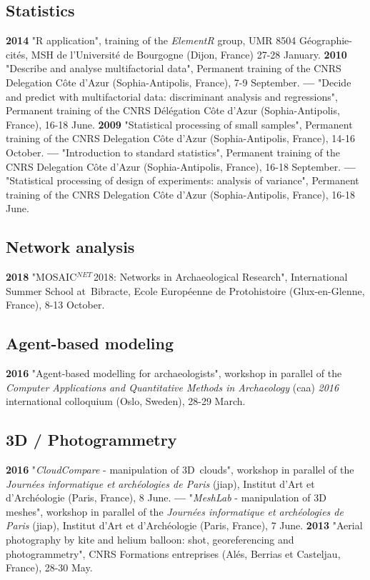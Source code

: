 \documentclass[11pt]{report} %
\begin{document}
\subsection*{Statistics }

\textbf{2014 }"\textsf{R} application", training of the \textit{ElementR} group, UMR 8504 G\'{e}ographie-cit\'{e}s, MSH de l'Universit\'{e} de Bourgogne (Dijon, France) 27-28 January.
\smallbreak
\textbf{2010 }"Describe and analyse multifactorial data", Permanent training of the CNRS Delegation C\^{o}te d'Azur (Sophia-Antipolis, France), 7-9 September.
\smallbreak
\textbf{---  }"Decide and predict with multifactorial data: discriminant analysis and regressions", Permanent training of the CNRS D\'{e}l\'{e}gation C\^{o}te d'Azur (Sophia-Antipolis, France), 16-18 June.
\smallbreak
\textbf{2009 }"Statistical processing of small samples", Permanent training of the CNRS Delegation C\^{o}te d'Azur (Sophia-Antipolis, France), 14-16 October.
\smallbreak
\textbf{---  }"Introduction to standard statistics", Permanent training of the CNRS Delegation C\^{o}te d'Azur (Sophia-Antipolis, France), 16-18 September.
\textbf{---  }"Statistical processing of design of experiments: analysis of variance", Permanent training of the CNRS Delegation C\^{o}te d'Azur (Sophia-Antipolis, France), 16-18 June.
\smallbreak

\subsection*{Network analysis}

\textbf{2018 }"MOSAIC${}^{NET\ }$2018: Networks in Archaeological Research", International Summer School at~Bibracte, Ecole Europ\'{e}enne de Protohistoire (Glux-en-Glenne, France), 8-13 October.

\subsection*{Agent-based modeling}

\textbf{2016 }"Agent-based modelling for archaeologists", workshop in parallel of the \textit{Computer Applications and Quantitative Methods in Archaeology }(caa) \textit{2016 }international colloquium (Oslo, Sweden), 28-29 March.

\subsection*{3D / Photogrammetry}

\textbf{2016 }"\textit{CloudCompare} - manipulation of 3D~clouds", workshop in parallel of the \textit{Journ\'{e}es informatique et arch\'{e}ologies de Paris} (jiap), Institut d'Art et d'Arch\'{e}ologie (Paris, France), 8 June.
\smallbreak
\textbf{---  }"\textit{MeshLab }- manipulation of 3D\textit{ }meshes", workshop in parallel of the \textit{Journ\'{e}es informatique et arch\'{e}ologies de Paris} (jiap), Institut d'Art et d'Arch\'{e}ologie (Paris, France), 7 June.
\smallbreak
\textbf{2013 }"Aerial photography by kite and helium balloon: shot, georeferencing and photogrammetry", CNRS Formations entreprises (Al\'{e}s, Berrias et Casteljau, France), 28-30 May.
\end{document}
